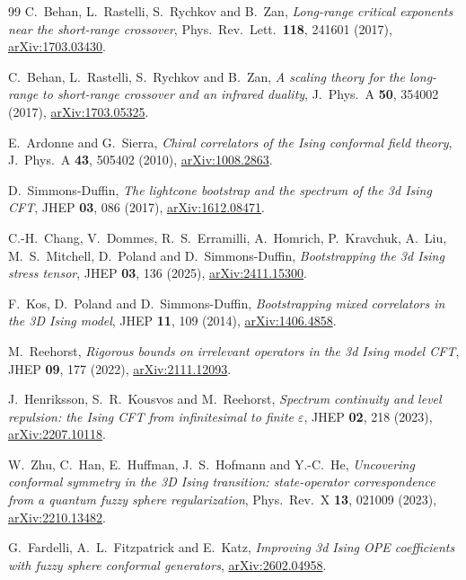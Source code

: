 \documentclass[11pt,a4paper]{article}
\numberwithin{equation}{section}
\begin{document}
\begin{thebibliography}{99}
C.~Behan, L.~Rastelli, S.~Rychkov and B.~Zan,
\emph{Long-range critical exponents near the short-range crossover},
Phys.\ Rev.\ Lett.\ \textbf{118}, 241601 (2017),
\href{https://arxiv.org/abs/1703.03430}{arXiv:1703.03430}.

C.~Behan, L.~Rastelli, S.~Rychkov and B.~Zan,
\emph{A scaling theory for the long-range to short-range crossover and an infrared duality},
J.\ Phys.\ A \textbf{50}, 354002 (2017),
\href{https://arxiv.org/abs/1703.05325}{arXiv:1703.05325}.

E.~Ardonne and G.~Sierra,
\emph{Chiral correlators of the Ising conformal field theory},
J.\ Phys.\ A \textbf{43}, 505402 (2010),
\href{https://arxiv.org/abs/1008.2863}{arXiv:1008.2863}.

D.~Simmons-Duffin,
\emph{The lightcone bootstrap and the spectrum of the 3d Ising CFT},
JHEP \textbf{03}, 086 (2017),
\href{https://arxiv.org/abs/1612.08471}{arXiv:1612.08471}.

C.-H.~Chang, V.~Dommes, R.~S.~Erramilli, A.~Homrich, P.~Kravchuk, A.~Liu, M.~S.~Mitchell, D.~Poland and
D.~Simmons-Duffin, \emph{Bootstrapping the 3d Ising stress tensor},
JHEP \textbf{03}, 136 (2025),
\href{https://arxiv.org/abs/2411.15300}{arXiv:2411.15300}.

F.~Kos, D.~Poland and D.~Simmons-Duffin,
\emph{Bootstrapping mixed correlators in the 3D Ising model},
JHEP \textbf{11}, 109 (2014),
\href{https://arxiv.org/abs/1406.4858}{arXiv:1406.4858}.

M.~Reehorst,
\emph{Rigorous bounds on irrelevant operators in the 3d Ising model CFT},
JHEP \textbf{09}, 177 (2022),
\href{https://arxiv.org/abs/2111.12093}{arXiv:2111.12093}.

J.~Henriksson, S.~R.~Kousvos and M.~Reehorst,
\emph{Spectrum continuity and level repulsion: the Ising CFT from infinitesimal to finite $\varepsilon$},
JHEP \textbf{02}, 218 (2023),
\href{https://arxiv.org/abs/2207.10118}{arXiv:2207.10118}.

W.~Zhu, C.~Han, E.~Huffman, J.~S.~Hofmann and Y.-C.~He,
\emph{Uncovering conformal symmetry in the 3D Ising transition: state-operator correspondence from a quantum fuzzy
sphere regularization}, Phys.\ Rev.\ X \textbf{13}, 021009 (2023),
\href{https://arxiv.org/abs/2210.13482}{arXiv:2210.13482}.

G.~Fardelli, A.~L.~Fitzpatrick and E.~Katz,
\emph{Improving 3d Ising OPE coefficients with fuzzy sphere conformal generators},
\href{https://arxiv.org/abs/2602.04958}{arXiv:2602.04958}.


\end{thebibliography}
\end{document}
